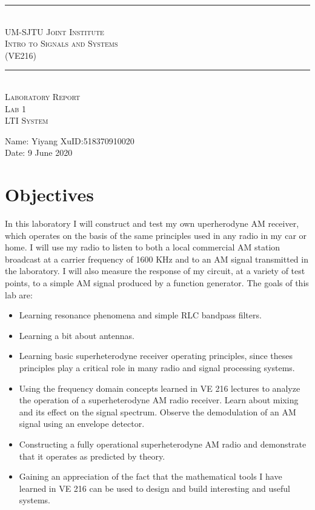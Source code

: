 \documentclass [utf8] {article}
\begin{document}
\begin{center}
\vspace*{2cm}
\rule{14cm}{0.5pt}\\
\Large{\textsc{UM-SJTU Joint Institute\\
Intro to Signals and Systems\\
(VE216)\\}}
\rule{14cm}{0.5pt}\\
\vspace*{3cm}
\Large{\textsc{Laboratory Report\\
Lab 1\\
LTI System}}
\vspace*{3cm}
\end{center}
\large{Name: Yiyang Xu\qquad ID:518370910020\\
Date: 9 June 2020}
\newpage

\section{Objectives}
{
	In this laboratory I will construct and test my own uperherodyne AM receiver, which operates on the basis of the same principles used in any radio in my car or home. I will use my radio to listen to both a local commercial AM station broadcast at a carrier frequency of 1600 KHz and to an AM signal transmitted in the laboratory. I will also measure the response of my circuit, at a variety of test points, to a simple AM signal produced by a function generator. The goals of this lab are:
\begin{itemize}
\item Learning resonance phenomena and simple RLC bandpass filters.
\item Learning a bit about antennas.
\item Learning basic superheterodyne receiver operating principles, since theses principles play a critical role in many radio and signal processing systems.
\item Using the frequency domain concepts learned in VE 216 lectures to analyze the operation of a
superheterodyne AM radio receiver. Learn about mixing and its effect on the signal spectrum. Observe the demodulation of an AM signal using an envelope detector.
\item Constructing a fully operational superheterodyne AM radio and demonstrate that it operates as predicted by theory.
\item Gaining an appreciation of the fact that the mathematical tools I have learned in VE 216 can be used to design and build interesting and useful systems.
\end{itemize}
}
\end{document}
